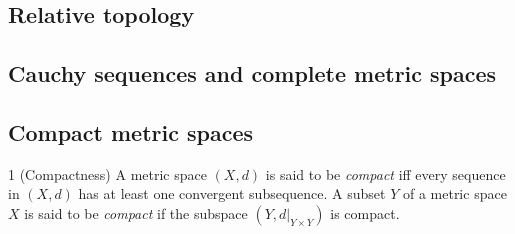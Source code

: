 \subsection{Relative topology}
\subsection{Cauchy sequences and complete metric spaces}
\subsection{Compact metric spaces}
\begin{definition}{1}
    \label{compactness}
    (Compactness) A metric space $(X, d)$ is said to be \emph{compact} iff every
    sequence in $(X, d)$ has at least one convergent subsequence. A subset $Y$ of
    a metric space $X$ is said to be \emph{compact} if the subspace $(Y, d|_{Y \times Y})$
    is compact.
\end{definition}
